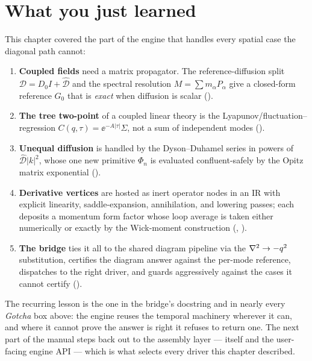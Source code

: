 \section{What you just learned}

This chapter covered the part of the engine that handles every spatial case the
diagonal path cannot:

\begin{enumerate}
  \item \textbf{Coupled fields} need a matrix propagator. The reference-diffusion
        split $\mathcal{D}=D_{0}I+\widehat{\mathcal{D}}$ and the spectral
        resolution $M=\sum m_{\alpha}P_{\alpha}$ give a closed-form reference
        $G_{0}$ that is \emph{exact} when diffusion is scalar
        ().
  \item \textbf{The tree two-point} of a coupled linear theory is the
        Lyapunov/fluctuation--regression $C(q,\tau)=\ee^{-A|\tau|}\Sigma$, not a
        sum of independent modes ().
  \item \textbf{Unequal diffusion} is handled by the Dyson--Duhamel series in
        powers of $\widehat{\mathcal{D}}|k|^{2}$, whose one new primitive
        $\Phi_{n}$ is evaluated confluent-safely by the Opitz matrix exponential
        ().
  \item \textbf{Derivative vertices} are hosted as inert operator nodes in an IR
        with explicit linearity, saddle-expansion, annihilation, and lowering
        passes; each deposits a momentum form factor whose loop average is taken
        either numerically or exactly by the Wick-moment construction
        (, ).
  \item \textbf{The bridge} ties it all to the shared diagram pipeline via the
        $\nabla^2\to-q^{2}$ substitution, certifies the diagram answer against the
        per-mode reference, dispatches to the right driver, and guards
        aggressively against the cases it cannot certify
        ().
\end{enumerate}

The recurring lesson is the one in the bridge's docstring and in nearly every
\emph{Gotcha} box above: the engine reuses the temporal machinery wherever it
can, and where it cannot prove the answer is right it refuses to return one. The
next part of the manual steps back out to the assembly layer ---
 itself and the user-facing engine API --- which is what
selects every driver this chapter described.
